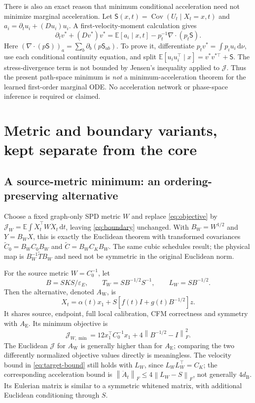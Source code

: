 \documentclass[11pt,letterpaper]{article}
\newcommand{\E}{\mathbb E}
\newcommand{\epsE}{\varepsilon_E}
\newcommand{\Cov}{\operatorname{Cov}}
\newcommand{\dd}{\,\mathrm d}
\newcommand{\norm}[1]{\left\lVert#1\right\rVert}
\newcommand{\bures}{d_{\mathrm B}}
\newcommand{\AltE}{A_{\mathrm E}}
\newcommand{\AltW}{A_{\mathrm W}}
\newcommand{\J}{\mathcal J}
\begin{document}
There is also an exact reason that minimum conditional acceleration need not minimize marginal acceleration. Let
$\mathsf S(x,t)=\Cov(U_t\mid X_t=x,t)$ and $a_i=\partial_tu_i+(Du_i)u_i$. A first-velocity-moment calculation gives
\begin{equation}
\boxed{\partial_tv^*+(Dv^*)v^*
=\E[a_i\mid x,t]-p_t^{-1}\nabla\cdot(p_t\mathsf S).}
\label{eq:stress}
\end{equation}
Here $(\nabla\cdot(p\mathsf S))_a=\sum_b\partial_b(p\mathsf S_{ab})$. To prove it, differentiate $p_tv^*=\int p_iu_i\dd\nu$, use each conditional continuity equation, and split $\E[u_iu_i^\top\mid x]=v^*v^{*\top}+\mathsf S$. The stress-divergence term is not bounded by Jensen's inequality applied to $\J$. Thus the present path-space minimum is \emph{not} a minimum-acceleration theorem for the learned first-order marginal ODE. No acceleration network or phase-space inference is required or claimed.

\section{Metric and boundary variants, kept separate from the core}
\label{sec:variants}

\subsection{A source-metric minimum: an ordering-preserving alternative}
\label{sec:metric}
Choose a fixed graph-only SPD metric $W$ and replace \eqref{eq:objective} by
$\J_W=\E\int\ddot X_t^\top W\ddot X_t\dd t$, leaving \eqref{eq:boundary} unchanged. With $B_W=W^{1/2}$ and $Y=B_WX$, this is exactly the Euclidean theorem with transformed covariances $\widetilde C_0=B_WC_0B_W$ and $\widetilde C=B_WC_KB_W$. The same cubic schedules result; the physical map is $B_W^{-1}\widetilde T B_W$ and need not be symmetric in the original Euclidean norm.

For the source metric $W=C_0^{-1}$, let
\begin{equation}
B=SKS/\epsE,\qquad T_W=SB^{-1/2}S^{-1},\qquad L_W=SB^{-1/2}.
\end{equation}
Then the alternative, denoted $\AltW$, is
\begin{equation}
\boxed{X_t=\alpha(t)x_1+S[f(t)I+g(t)B^{-1/2}]z.}
\label{eq:AW}
\end{equation}
It shares source, endpoint, full local calibration, CFM correctness and symmetry with $\AltE$. Its minimum objective is
\begin{equation}
\J_{W,\min}=12x_1^\top C_0^{-1}x_1+4\norm{B^{-1/2}-I}_F^2.
\end{equation}
The Euclidean $\J$ for $\AltW$ is generally higher than for $\AltE$; comparing the two differently normalized objective values directly is meaningless. The velocity bound in \eqref{eq:target-bound} still holds with $L_W$, since $L_WL_W^\top=C_K$; the corresponding acceleration bound is $\norm{\ddot A_t}_F\leq4\norm{L_W-S}_F$, not generally $4\bures$. Its Eulerian matrix is similar to a symmetric whitened matrix, with additional Euclidean conditioning through $S$.
\end{document}

